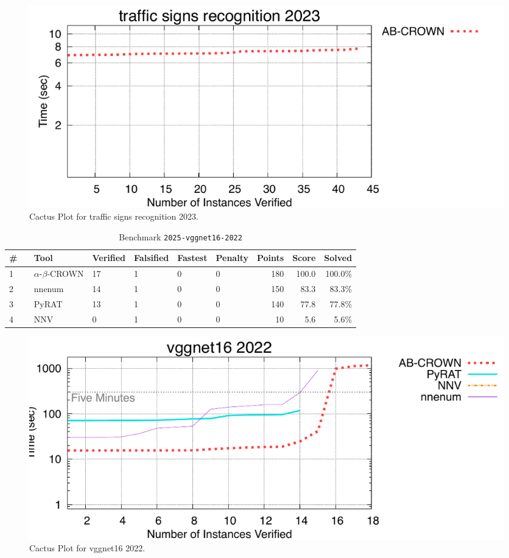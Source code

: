 \begin{figure}[h]
\centerline{\includegraphics[width=\textwidth]{cactus/2025_traffic_signs_recognition_2023.pdf}}
\caption{Cactus Plot for traffic signs recognition 2023.}
\label{fig:quantPic}
\end{figure}


\clearpage

\begin{table}[h]
\begin{center}
\caption{Benchmark \texttt{2025-vggnet16-2022}} \label{tab:cat_2025_vggnet16_2022}
{\setlength{\tabcolsep}{2pt}
\begin{tabular}[h]{@{}llllllrrr@{}}
\toprule
\textbf{\# ~} & \textbf{Tool} & \textbf{Verified} & \textbf{Falsified} & \textbf{Fastest} & \textbf{Penalty} & \textbf{Points} & \textbf{Score} & \textbf{Solved}\\
\midrule
1 & $\alpha$-$\beta$-CROWN & 17 & 1 & 0 & 0 & 180 & 100.0 & 100.0\% \\
2 & nnenum & 14 & 1 & 0 & 0 & 150 & 83.3 & 83.3\% \\
3 & PyRAT & 13 & 1 & 0 & 0 & 140 & 77.8 & 77.8\% \\
4 & NNV & 0 & 1 & 0 & 0 & 10 & 5.6 & 5.6\% \\
\bottomrule
\end{tabular}
}
\end{center}
\end{table}



\begin{figure}[h]
\centerline{\includegraphics[width=\textwidth]{cactus/2025_vggnet16_2022.pdf}}
\caption{Cactus Plot for vggnet16 2022.}
\label{fig:quantPic}
\end{figure}



